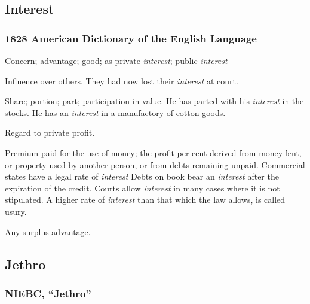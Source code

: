 	\subsection{Interest} %
		\label{INTEREST}
		
		\subsubsection{1828 American Dictionary of the English Language}

			\begin{compactitem}
				\item Concern; advantage; good; as private \textit{interest}; public \textit{interest}
				\item[1] Influence over others. They had now lost their \textit{interest} at court.
				\item[2] Share; portion; part; participation in value. He has parted with his \textit{interest} in the stocks. He has an \textit{interest} in a manufactory of cotton goods.
				\item[3] Regard to private profit.
				\item[4] Premium paid for the use of money; the profit per cent derived from money lent, or property used by another person, or from debts remaining unpaid. Commercial states have a legal rate of \textit{interest} Debts on book bear an \textit{interest} after the expiration of the credit. Courts allow \textit{interest} in many cases where it is not stipulated. A higher rate of \textit{interest} than that which the law allows, is called usury.
				\item[5] Any surplus advantage.
			\end{compactitem}


	\subsection{Jethro} %
		\label{JETHRO}
	
		\subsubsection{NIEBC, ``Jethro''}
		
